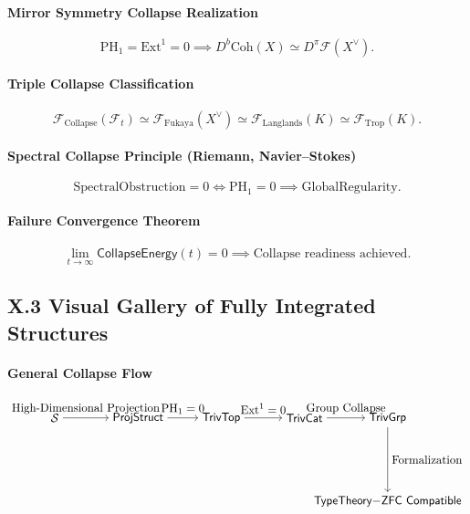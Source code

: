 \documentclass[11pt]{article}
\begin{document}
\paragraph{Mirror Symmetry Collapse Realization}
\[
\mathrm{PH}_1 = \mathrm{Ext}^1 = 0 \implies
D^b\mathrm{Coh}(X) \simeq D^\pi\mathcal{F}(X^\vee).
\]

\paragraph{Triple Collapse Classification}
\[
\mathcal{F}_{\mathrm{Collapse}}(\mathcal{F}_t) \simeq
\mathcal{F}_{\mathrm{Fukaya}}(X^\vee) \simeq \mathcal{F}_{\mathrm{Langlands}}(K) \simeq \mathcal{F}_{\mathrm{Trop}}(K).
\]

\paragraph{Spectral Collapse Principle (Riemann, Navier–Stokes)}
\[
\mathrm{SpectralObstruction} = 0 \iff \mathrm{PH}_1 = 0 \implies \mathrm{GlobalRegularity}.
\]

\paragraph{Failure Convergence Theorem}
\[
\lim_{t \to \infty} \mathsf{CollapseEnergy}(t) = 0 \implies \text{Collapse readiness achieved}.
\]

\subsection*{X.3 Visual Gallery of Fully Integrated Structures}

\paragraph{General Collapse Flow}
\[
\begin{tikzpicture}[node distance=2.5cm, auto]
  \node (S) {$\mathcal{S}$};
  \node (P) [right of=S] {$\mathsf{ProjStruct}$};
  \node (T) [right of=P] {$\mathsf{TrivTop}$};
  \node (C) [right of=T] {$\mathsf{TrivCat}$};
  \node (G) [right of=C] {$\mathsf{TrivGrp}$};
  \node (F) [below of=G] {$\mathsf{TypeTheory{-}ZFC\ Compatible}$};
  \draw[->] (S) to node {High-Dimensional Projection} (P);
  \draw[->] (P) to node {$\mathrm{PH}_1 = 0$} (T);
  \draw[->] (T) to node {$\mathrm{Ext}^1 = 0$} (C);
  \draw[->] (C) to node {Group Collapse} (G);
  \draw[->] (G) to node {Formalization} (F);
\end{tikzpicture}
\]
\end{document}
